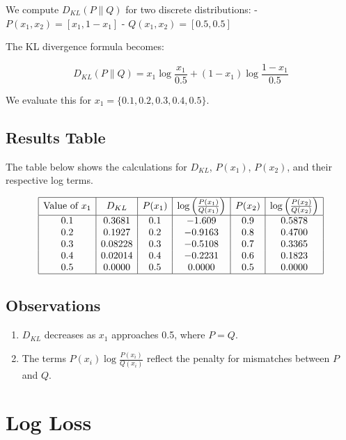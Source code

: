 \documentclass[
  12 pt,
  a4paper,
]{book}
\providecommand{\tightlist}{%
  \setlength{\itemsep}{0pt}\setlength{\parskip}{0pt}}
\numberwithin{equation}{section}
\theoremstyle{plain}      %
\theoremstyle{definition} %
\theoremstyle{remark}     %
\theoremstyle{note}         %
\begin{document}
We compute \(D_{KL}(P \| Q)\) for two discrete distributions: -
\(P(x_1, x_2) = [x_1, 1-x_1]\) - \(Q(x_1, x_2) = [0.5, 0.5]\)

The KL divergence formula becomes:

\[
D_{KL}(P \| Q) = x_1 \log \frac{x_1}{0.5} + (1 - x_1) \log \frac{1 - x_1}{0.5}
\]

We evaluate this for \(x_1 = \{0.1, 0.2, 0.3, 0.4, 0.5\}\).

\hypertarget{results-table}{%
\section{Results Table}\label{results-table}}

The table below shows the calculations for \(D_{KL}\), \(P(x_1)\),
\(P(x_2)\), and their respective log terms.

\[
\begin{array}{|c|c|c|c|c|c|}
\hline
\text{Value of } x_1 & D_{KL} & P(x_1) & \log \left(\frac{P(x_1)}{Q(x_1)}\right) & P(x_2) & \log \left(\frac{P(x_2)}{Q(x_2)}\right) \\
\hline
0.1 & 0.3681 & 0.1 & -1.609 & 0.9 & 0.5878 \\
0.2 & 0.1927 & 0.2 & -0.9163 & 0.8 & 0.4700 \\
0.3 & 0.08228 & 0.3 & -0.5108 & 0.7 & 0.3365 \\
0.4 & 0.02014 & 0.4 & -0.2231 & 0.6 & 0.1823 \\
0.5 & 0.0000 & 0.5 & 0.0000 & 0.5 & 0.0000 \\
\hline
\end{array}
\]

\hypertarget{observations-1}{%
\section{Observations}\label{observations-1}}

\begin{enumerate}
\def\labelenumi{\arabic{enumi}.}
\tightlist
\item
  \(D_{KL}\) decreases as \(x_1\) approaches 0.5, where \(P = Q\).
\item
  The terms \(P(x_i) \log \frac{P(x_i)}{Q(x_i)}\) reflect the penalty
  for mismatches between \(P\) and \(Q\).
\end{enumerate}

\newpage

\hypertarget{log-loss}{%
\chapter{Log Loss}\label{log-loss}}
\end{document}
